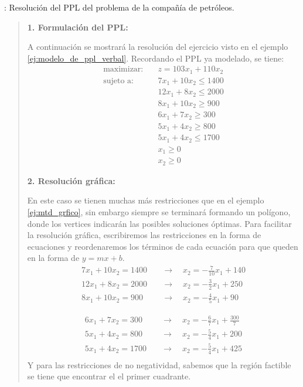 \ejemplo\label{ej:resolucion_ppl_petroleos_grafico}: Resolución del PPL del problema de la compañía de petróleos. 
\begin{quote}
  \textbf{1. Formulación del PPL:}

  A continuación se mostrará la resolución del ejercicio visto en el ejemplo \ref{ej:modelo_de_ppl_verbal}. Recordando el PPL ya modelado, se tiene:
  \begin{align*}
    \text{maximizar:} \quad   &z = 103x_1 + 110x_2 \\[3pt]
    \text{sujeto a:} \quad    &7x_1 + 10x_2 \leq 1400 \\
                              &12x_1 + 8x_2 \leq 2000 \\
                              &8x_1 + 10x_2 \geq 900 \\
                              &6x_1 + 7x_2 \geq 300 \\
                              &5x_1 + 4x_2 \geq 800 \\
                              & 5x_1 + 4x_2 \leq 1700 \\
                              &x_1 \geq 0 \\
                              &x_2 \geq 0
  \end{align*}

  \textbf{2. Resolución gráfica:}

  En este caso se tienen muchas más restricciones que en el ejemplo \ref{ej:mtd_grfico}, sin embargo siempre se terminará formando un polígono, donde los vertices indicarán las posibles soluciones óptimas. Para facilitar la resolución gráfica, escribiremos las restricciones en la forma de ecuaciones y reordenaremos los términos de cada ecuación para que queden en la forma de \(y = mx + b\).
  \begin{align*}
    7x_1 + 10x_2 = 1400 \quad &\rightarrow \quad x_2 = -\frac{7}{10}x_1 + 140 \\
    12x_1 + 8x_2 = 2000 \quad &\rightarrow \quad x_2 = -\frac{3}{2}x_1 + 250 \\
    8x_1 + 10x_2 = 900  \quad &\rightarrow \quad x_2 = -\frac{4}{5}x_1 + 90
  \end{align*}

  \begin{align*}
    6x_1 + 7x_2 = 300  \quad &\rightarrow \quad x_2 = -\frac{6}{7}x_1 + \frac{300}{7} \\
    5x_1 + 4x_2 = 800  \quad &\rightarrow \quad x_2 = -\frac{5}{4}x_1 + 200 \\
    5x_1 + 4x_2 = 1700 \quad &\rightarrow \quad x_2 = -\frac{5}{4}x_1 + 425 \\
  \end{align*}
  Y para las restricciones de no negatividad, sabemos que la región factible se tiene que encontrar el el primer cuadrante.


\end{quote}
